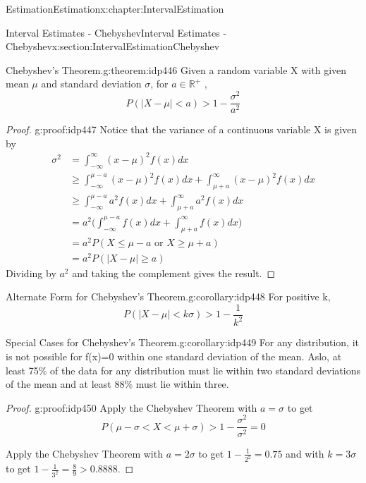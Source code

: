 \documentclass[oneside,10pt,]{book}
\numberwithin{equation}{section}
\newcommand{\lt}{<}
\newcommand{\gt}{>}
\begin{document}
\begin{chapterptx}{Estimation}{}{Estimation}{}{}{x:chapter:IntervalEstimation}
\begin{sectionptx}{Interval Estimates - Chebyshev}{}{Interval Estimates - Chebyshev}{}{}{x:section:IntervalEstimationChebyshev}
\begin{theorem}{Chebyshev's Theorem.}{}{g:theorem:idp446}
Given a random variable X with given mean \(\mu\) and standard deviation \(\sigma\), for \(a \in \mathbb{R}^+\) ,%
\begin{equation*}
P( \big | X - \mu \big | \lt a ) \gt 1 - \frac{\sigma^2}{a^2}
\end{equation*}
%
\end{theorem}
\begin{proof}{}{g:proof:idp447}
Notice that the variance of a continuous variable X is given by%
\begin{align*}
\sigma^2 & = \int_{-\infty}^{\infty} (x - \mu)^2 f(x) dx\\
& \ge \int_{-\infty}^{\mu-a} (x - \mu)^2 f(x) dx + \int_{\mu + a}^{\infty} (x - \mu)^2 f(x) dx\\
& \ge \int_{-\infty}^{\mu-a} a^2 f(x) dx + \int_{\mu + a}^{\infty} a^2 f(x) dx\\
& = a^2 \big ( \int_{-\infty}^{\mu-a} f(x) dx + \int_{\mu + a}^{\infty} f(x) dx \big )\\
& = a^2 P( X \le \mu - a \text{  or  } X \ge \mu + a )\\
& = a^2 P( \big | X - \mu \big | \ge a)
\end{align*}
Dividing by \(a^2\) and taking the complement gives the result.%
\end{proof}
\begin{corollary}{Alternate Form for Chebyshev's Theorem.}{}{g:corollary:idp448}%
For positive k,%
\begin{equation*}
P( \big | X - \mu \big | \lt k \sigma ) \gt 1 - \frac{1}{k^2}
\end{equation*}
%
\end{corollary}
\begin{corollary}{Special Cases for Chebyshev's Theorem.}{}{g:corollary:idp449}%
For any distribution, it is not possible for f(x)=0 within one standard deviation of the mean. Aslo, at least 75\% of the data for any distribution must lie within two standard deviations of the mean and at least 88\% must lie within three.%
\end{corollary}
\begin{proof}{}{g:proof:idp450}
Apply the Chebyshev Theorem with \(a = \sigma\) to get%
\begin{equation*}
P(\mu - \sigma \lt X \lt \mu + \sigma) \gt 1 - \frac{\sigma^2}{\sigma^2} = 0
\end{equation*}
%
\par
Apply the Chebyshev Theorem with \(a = 2 \sigma\) to get \(1 - \frac{1}{2^2} = 0.75\) and with \(k = 3 \sigma\) to get \(1 - \frac{1}{3^2} = \frac{8}{9} > 0.8888\).%

\end{proof}
\end{sectionptx}
\end{chapterptx}
\end{document}
